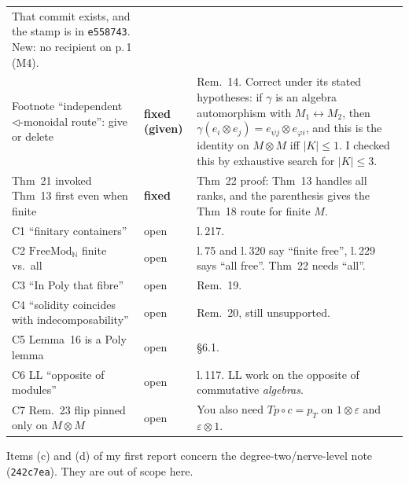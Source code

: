 \documentclass[11pt]{article}
\newcommand{\tri}{\mathbin{\triangleleft}}
\newcommand{\N}{\mathbb{N}}
\begin{document}
\begin{center}
\begin{tabular}{p{3.6cm}p{2.0cm}p{9.6cm}}
That commit exists, and the stamp is in \texttt{e558743}. New: no recipient on p.\,1 (M4).\\
Footnote ``independent $\tri$-monoidal route'': give or delete & \textbf{fixed (given)} &
Rem.~14. Correct under its stated hypotheses: if $\gamma$ is an algebra automorphism with
$M_1\leftrightarrow M_2$, then $\gamma(e_i\otimes e_j)=e_{\psi j}\otimes e_{\varphi i}$, and this
is the identity on $M\otimes M$ iff $|K|\le1$. I checked this by exhaustive search for $|K|\le3$.\\
Thm~21 invoked Thm~13 first even when finite & \textbf{fixed} & Thm~22 proof: Thm~13 handles all
ranks, and the parenthesis gives the Thm~18 route for finite $M$.\\
C1 ``finitary containers'' & open & l.\,217.\\
C2 $\mathrm{FreeMod}_\N$ finite vs.\ all & open & l.\,75 and l.\,320 say ``finite free'', l.\,229
says ``all free''. Thm~22 needs ``all''.\\
C3 ``In Poly that fibre'' & open & Rem.~19.\\
C4 ``solidity coincides with indecomposability'' & open & Rem.~20, still unsupported.\\
C5 Lemma~16 is a Poly lemma & open & \S6.1.\\
C6 LL ``opposite of modules'' & open & l.\,117. LL work on the opposite of commutative
\emph{algebras}.\\
C7 Rem.~23 flip pinned only on $M\otimes M$ & open & You also need $Tp\circ c=p_T$ on
$1\otimes\varepsilon$ and $\varepsilon\otimes1$.\\
\bottomrule
\end{tabular}
\end{center}
Items (c) and (d) of my first report concern the degree-two/nerve-level note (\texttt{242c7ea}).
They are out of scope here.
\end{document}
